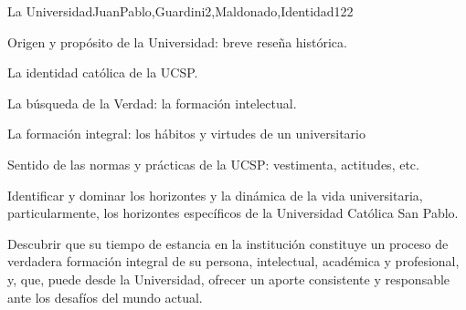 \begin{syllabus}
\begin{unit}{La Universidad}{JuanPablo,Guardini2,Maldonado,Identidad}{12}{2}
\begin{topics}
	\item Origen y propósito de la Universidad: breve reseña histórica.
	\item La identidad católica de la UCSP.
	\item La búsqueda de la Verdad: la formación intelectual.
	\item La formación integral: los hábitos y virtudes de un universitario
	\item Sentido de las normas y prácticas de la UCSP: vestimenta, actitudes, etc.
\end{topics}
\begin{learningoutcomes}
	\item Identificar y dominar los horizontes y la dinámica de la vida universitaria, particularmente,  los horizontes específicos de la Universidad Católica San Pablo.
	\item Descubrir que su tiempo de estancia en la institución constituye un proceso de verdadera formación integral de su persona, intelectual, académica y profesional, y, que, puede desde la Universidad, ofrecer un aporte consistente y responsable ante los desafíos del mundo actual.   
\end{learningoutcomes}
\end{unit}



\begin{coursebibliography}
\end{coursebibliography}

\end{syllabus}
